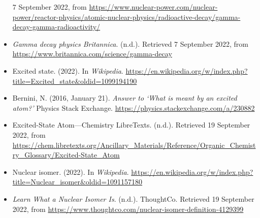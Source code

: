 \documentclass[
]{article}
\begin{document}
\begin{itemize}
  7 September 2022, from
  \url{https://www.nuclear-power.com/nuclear-power/reactor-physics/atomic-nuclear-physics/radioactive-decay/gamma-decay-gamma-radioactivity/}
\item
  \emph{Gamma decay \textbar{} physics \textbar{} Britannica}. (n.d.).
  Retrieved 7 September 2022, from
  \url{https://www.britannica.com/science/gamma-decay}
\item
  Excited state. (2022). In \emph{Wikipedia}.
  \url{https://en.wikipedia.org/w/index.php?title=Excited_state\&oldid=1099194190}
\item
  Bernini, N. (2016, January 21). \emph{Answer to `What is meant by an
  excited atom?'} Physics Stack Exchange.
  \url{https://physics.stackexchange.com/a/230882}
\item
  Excited-State Atom---Chemistry LibreTexts. (n.d.). Retrieved 19
  September 2022, from
  \url{https://chem.libretexts.org/Ancillary_Materials/Reference/Organic_Chemistry_Glossary/Excited-State_Atom}
\item
  Nuclear isomer. (2022). In \emph{Wikipedia}.
  \url{https://en.wikipedia.org/w/index.php?title=Nuclear_isomer\&oldid=1091157180}
\item
  \emph{Learn What a Nuclear Isomer Is}. (n.d.). ThoughtCo. Retrieved 19
  September 2022, from
  \url{https://www.thoughtco.com/nuclear-isomer-definition-4129399}
\end{itemize}
\end{document}
